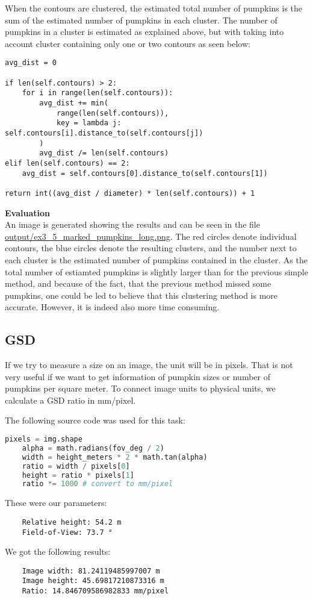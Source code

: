 \documentclass[../Head/Main.tex]{subfiles}
\begin{document}
When the contours are clustered, the estimated total number of pumpkins is the sum of the estimated number of pumpkins in each cluster. The number of pumpkins in a cluster is estimated as explained above, but with taking into account cluster containing only one or two contours as seen below:
\begin{verbatim}
avg_dist = 0

if len(self.contours) > 2:
	for i in range(len(self.contours)):
    	avg_dist += min(
        	range(len(self.contours)),
            key = lambda j: self.contours[i].distance_to(self.contours[j])
        )
		avg_dist /= len(self.contours)
elif len(self.contours) == 2:
	avg_dist = self.contours[0].distance_to(self.contours[1])

return int((avg_dist / diameter) * len(self.contours)) + 1
\end{verbatim}
\textbf{Evaluation}\\
An image is generated showing the results and can be seen in the file \url{output/ex3_5_marked_pumpkins_long.png}. The red circles denote individual contours, the blue circles denote the resulting clusters, and the number next to each cluster is the estimated number of pumpkins contained in the cluster. As the total number of estiamted pumpkins is slightly larger than for the previous simple method, and because of the fact, that the previous method missed some pumpkins, one could be led to believe that this clustering method is more accurate. However, it is indeed also more time consuming.

\subsection{GSD}\label{subsec:gsd}

If we try to measure a size on an image, the unit will be in pixels. That is not very useful if we want to get information of pumpkin sizes or number of pumpkins per square meter. To connect image units to physical units, we calculate a GSD ratio in mm/pixel.

The following source code was used for this task:

\begin{lstlisting}[language=Python]
    pixels = img.shape
    alpha = math.radians(fov_deg / 2)
    width = height_meters * 2 * math.tan(alpha)
    ratio = width / pixels[0]
    height = ratio * pixels[1]
    ratio *= 1000 # convert to mm/pixel
\end{lstlisting}

These were our parameters:

\begin{verbatim}
    Relative height: 54.2 m
    Field-of-View: 73.7 °
\end{verbatim}


We got the following results:

\begin{verbatim}
    Image width: 81.24119485997007 m
    Image height: 45.69817210873316 m
    Ratio: 14.846709586982833 mm/pixel
\end{verbatim}
\end{document}
